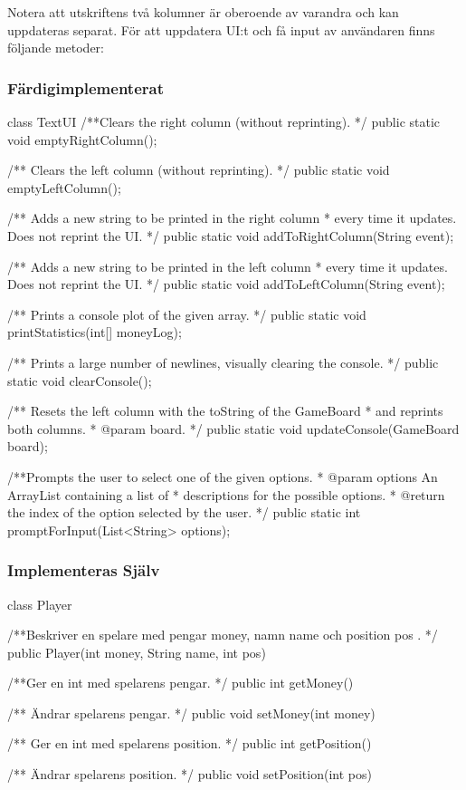 Notera att utskriftens två kolumner är oberoende av varandra och kan uppdateras separat. För att uppdatera UI:t och få input av användaren finns följande metoder:
\subsubsection{Färdigimplementerat}
\begin{JavaSpec}{class TextUI}
     /**Clears the right column (without reprinting). */
    public static void emptyRightColumn();

    /** Clears the left column (without reprinting). */
    public static void emptyLeftColumn();

    /** Adds a new string to be printed in the right column
     * every time it updates. Does not reprint the UI. */
    public static void addToRightColumn(String event);

    /** Adds a new string to be printed in the left column
     * every time it updates. Does not reprint the UI. */
    public static void addToLeftColumn(String event);

    /** Prints a console plot of the given array. */
    public static void printStatistics(int[] moneyLog);

    /** Prints a large number of newlines, visually clearing the console. */
    public static void clearConsole();

    /** Resets the left column with the toString of the GameBoard
     * and reprints both columns.
     * @param board. 
     */
    public static void updateConsole(GameBoard board);

    /**Prompts the user to select one of the given options.
     * @param options An ArrayList containing a list of
     *          descriptions for the possible options.
     * @return the index of the option selected by the user.
     */
    public static int promptForInput(List<String> options);
\end{JavaSpec}

\subsubsection{Implementeras Själv}
\begin{JavaSpec}{class Player}

/**Beskriver en spelare med pengar money, namn name och position pos . */
public Player(int money, String name, int pos)

/**Ger en int med spelarens pengar. */
public int getMoney()

/** Ändrar spelarens pengar. */
public void setMoney(int money)

/** Ger en int med spelarens position. */
public int getPosition()

/** Ändrar spelarens position. */
public void setPosition(int pos)

\end{JavaSpec}

